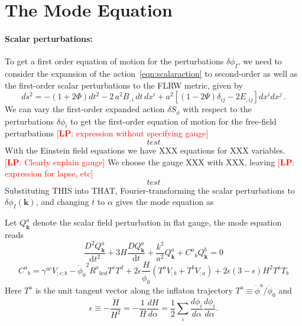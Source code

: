 \documentclass[11pt]{article}
\newcommand{\ud}{\mathrm{d}}
\def\bk{{\mathbf{k}}}
\def\f {{\phi}}
\newcommand{\lp}[1]{\textcolor{red}{[{\bf LP}: #1]}}
\begin{document}
\section{The Mode Equation}

\paragraph{Scalar perturbations:} To get a first order equation of motion for the perturbations $\delta \phi_I$, we need to consider the expansion of the action~\eqref{eqn:scalaraction} to second-order as well as the first-order scalar perturbations to the FLRW metric, given by
\begin{equation}
  ds^2 = -  \left(1 + 2 \Phi \right) dt^2 - 2 \, a^2 B_{,i} \, dt \,  dx^i + a^2 \left[ \left(1 - 2\Psi \right) \delta_{ij} - 2E_{,ij} \right] dx^i dx^j \, .
  \label{eqn:XXX}
\end{equation}
We can vary the first-order expanded action $\delta S_\phi$ with respect to the perturbations $\delta \phi_i$ to get the first-order equation of motion for the free-field perturbations \lp{expression without specifying gauge}
\begin{equation}
  test
  \label{eqn:XXX}
\end{equation}
With the Einstein field equations we have XXX equations for XXX variables.  \lp{Clearly explain gauge}  We choose the gauge XXX with XXX, leaving \lp{expression for lapse, etc}
\begin{equation}
  test
  \label{eqn:XXX}
\end{equation}
Substituting THIS into THAT, Fourier-transforming the scalar perturbations to $\delta \phi_I(\bk)$, and changing $t$ to $\alpha$ gives the mode equation as

Let $Q^a_\bk$ denote the scalar field perturbation in flat gauge, the mode equation reads \cite{Sasaki:1995aw}
\begin{equation}
\frac{D^2 Q_\bk^a}{\ud t^2} + 3H \frac{D Q_\bk^a}{\ud t} + \frac{k^2}{a^2} Q^a_\bk + {C^a}_b Q^b_\bk = 0
\end{equation}
\begin{equation}
{C^a}_b = \gamma^{ac}V_{;c;b} - {\dot\f_0}^2 {R^a}_{bcd} T^c T^d + 2\epsilon \frac{H}{\dot\f_0} (T^a V_{;b} + T^b V_{;a}) + 2\epsilon(3-\epsilon) H^2 T^a T_b
\end{equation}
Here $T^a$ is the unit tangent vector along the inflaton trajectory
$T^a \equiv \dot{\f}^a/\dot{\f}_0$ and
\begin{equation}
  \epsilon\equiv-\frac{\dot H}{H^2}=-\frac{1}{H}\frac{dH}{d\alpha}=\frac{1}{2}\sum_i \frac{d\phi_i}{d\alpha} \frac{d\phi_i}{d\alpha}.
  \label{eqn:XXX}
\end{equation}
\end{document}
